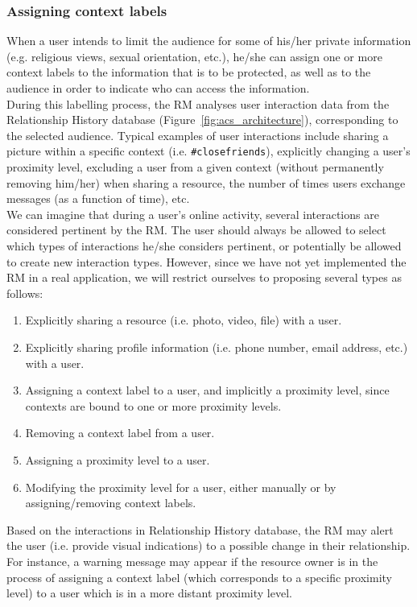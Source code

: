 \subsubsection{Assigning context labels}
When a user intends to limit the audience for some of his/her private information (e.g. religious views, sexual orientation, etc.), he/she can assign one or more context labels to the information that is to be protected, as well as to the audience in order to indicate who can access the information.\\
	
During this labelling process, the RM analyses user interaction data from the Relationship History database (Figure~\ref{fig:acs_architecture}), corresponding to the selected audience. Typical examples of user interactions include sharing a picture within a specific context (i.e. \verb+#closefriends+), explicitly changing a user's proximity level, excluding a user from a given context (without permanently removing him/her) when sharing a resource, the number of times users exchange messages (as a function of time), etc.\\

We can imagine that during a user's online activity, several interactions are considered pertinent by the RM. The user should always be allowed to select which types of interactions he/she considers pertinent, or potentially be allowed to create new interaction types. However, since we have not yet implemented the RM in a real application, we will restrict ourselves to proposing several types as follows:

\begin{enumerate}
\item Explicitly sharing a resource (i.e. photo, video, file) with a user.
\item Explicitly sharing profile information (i.e. phone number, email address, etc.) with a user.
\item Assigning a context label to a user, and implicitly a proximity level, since contexts are bound to one or more proximity levels.
\item Removing a context label from a user.
\item Assigning a proximity level to a user.
\item Modifying the proximity level for a user, either manually or by assigning/removing context labels.
\end{enumerate}

Based on the interactions in Relationship History database, the RM may alert the user (i.e. provide visual indications) to a possible change in their relationship. For instance, a warning message may appear if the resource owner is in the process of assigning a context label (which corresponds to a specific proximity level) to a user which is in a more distant proximity level.

